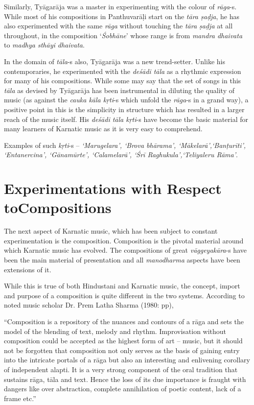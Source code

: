 Similarly, Tyāgarāja was a master in experimenting with the colour of \textit{rāga}-s. While most of his compositions in Panthuvarāḷi start on the \textit{tāra ṣaḍja}, he has also experimented with the same \textit{rāga} without touching the \textit{tāra ṣaḍja} at all throughout, in the composition ‘\textit{Śobhāne}’ whose range is from \textit{mandra dhaivata} to \textit{madhya sthāyi dhaivata}.

In the domain of \textit{tāla}-s also, Tyāgarāja was a new trend-setter. Unlike his contemporaries, he experimented with the \textit{deśādi tāla} as a rhythmic expression for many of his compositions. While some may say that the set of songs in this \textit{tāla} as devised by Tyāgarāja has been instrumental in diluting the quality of music (as against the \textit{cauka kāla kṛti}-s which unfold the \textit{rāga}-s in a grand way), a positive point in this is the simplicity in structure which has resulted in a larger reach of the music itself. His \textit{deśādi tāla kṛti}-s have become the basic material for many learners of Karnatic music as it is very easy to comprehend.

Examples of such \textit{kṛti}-s – \textit{‘Marugelara’, ‘Brova bhārama’, ‘Mākelarā’,\break ‘Banṭurīti’, ‘Entanercina’, ‘Gānamūrte’, ‘Calamelarā’, ‘Śrī Raghukula’,\break ‘Teliyaleru Rāma’}.

\newpage

\section*{Experimentations with Respect to\hfill \break Compositions}

The next aspect of Karnatic music, which has been subject to constant experimentation is the composition. Composition is the pivotal material around which Karnatic music has evolved. The compositions of great \textit{vāggeyakāra}-s have been the main material of presentation and all \textit{manodharma} aspects have been extensions of it.

While this is true of both Hindustani and Karnatic music, the concept, import and purpose of a composition is quite different in the two systems. According to noted music scholar Dr. Prem Latha Sharma (1980: pp),

\begin{myquote}
“Composition is a repository of the nuances and contours of a rāga and sets the model of the blending of text, melody and rhythm. Improvisation without composition could be accepted as the highest form of art – music, but it should not be forgotten that composition not only serves as the basis of gaining entry into the intricate portals of a rāga but also an interesting and enlivening corollary of independent alapti. It is a very strong component of the oral tradition that sustains rāga, tāla and text. Hence the loss of its due importance is fraught with dangers like over abstraction, complete annihilation of poetic content, lack of a frame etc.”
\end{myquote}

